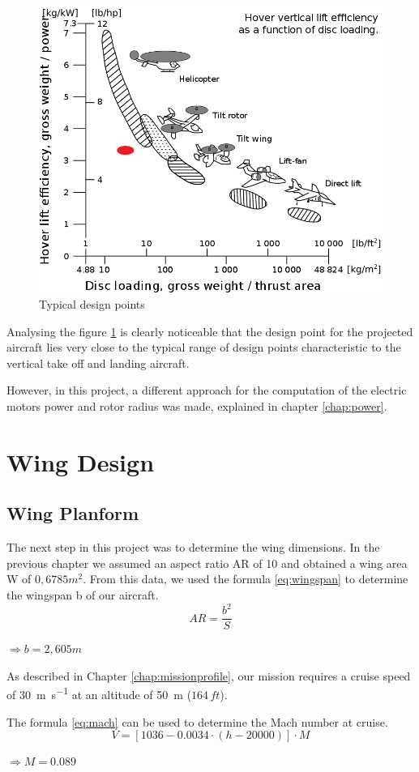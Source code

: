 \documentclass[english,fira]{ist-report}
\begin{document}
\begin{figure}[ht]
	\centering
	\includegraphics[width = 0.6\linewidth]{graphics/Disk_loading_different_aircraft.png}
	\caption{Typical design points}
	\label{fig:typical_vertical_design_point}
\end{figure}

Analysing the figure \ref{fig:typical_vertical_design_point} is clearly noticeable that the design point for the projected aircraft lies very close to the typical range of design points characteristic to the vertical take off and landing aircraft.

However, in this project, a different approach for the computation of the electric motors power and rotor radius was made, explained in chapter \ref{chap:power}.

\chapter{Wing Design}\label{chap:wingDesign}
\section{Wing Planform}
The next step in this project was to determine the wing dimensions. In the previous chapter we assumed an aspect ratio AR of 10 and obtained a wing area W of $0,6785m^2$. From this data, we used the formula \ref{eq:wingspan} to determine the wingspan b of our aircraft. 
\begin{equation}\label{eq:wingspan}
    AR=\frac{b^2}{S}
\end{equation}
\begin{center}
    $\Rightarrow b=2,605m$
\end{center}

As described in Chapter \ref{chap:missionprofile}, our mission requires a cruise speed of \SI{30}{\meter\per\second} at an altitude of \SI{50}{\meter} ($164\,ft$). \par
The formula \ref{eq:mach} can be used to determine the Mach number at cruise. 
\begin{equation}\label{eq:mach}
    V=[1036-0.0034\cdot (h-20000)] \cdot M
\end{equation}
\begin{center}
    $\Rightarrow M=0.089$
\end{center}
\end{document}
